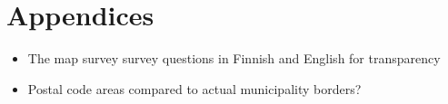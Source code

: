 \section{Appendices}
\justify
\begin{itemize}
  \item The map survey survey questions in Finnish and English for transparency
  \item Postal code areas compared to actual municipality borders?
\end{itemize}